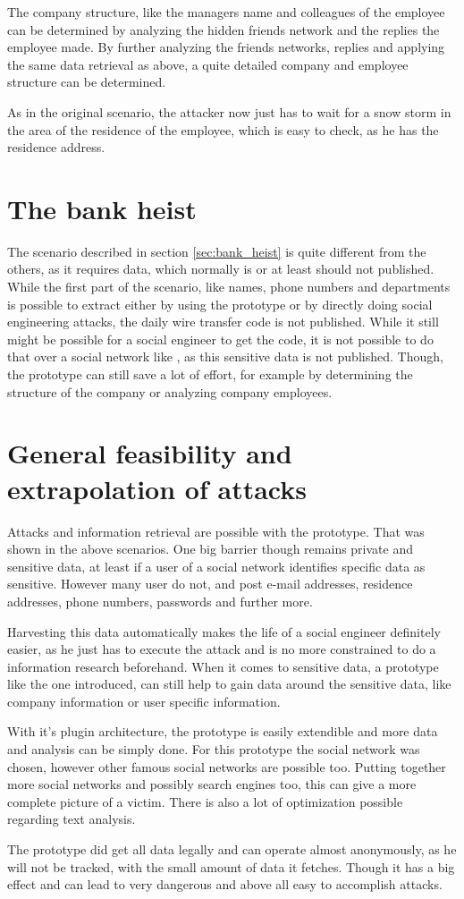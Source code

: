 The company structure, like the managers name and colleagues of the employee
can be determined by analyzing the hidden friends network and the replies the
employee made. By further analyzing the friends networks, replies and applying
the same data retrieval as above, a quite detailed company and employee
structure can be determined.

As in the original scenario, the attacker now just has to wait for a snow storm
in the area of the residence of the employee, which is easy to check, as he
has the residence address.

\section{The bank heist}

The scenario described in section \ref{sec:bank_heist} is quite different from
the others, as it requires data, which normally is or at least should not
published. While the first part of the scenario, like names, phone numbers and
departments is possible to extract either by using the prototype or by directly
doing social engineering attacks, the daily wire transfer code is not
published. While it still might be possible for a social engineer to get the
code, it is not possible to do that over a social network like \Twitter{}, as
this sensitive data is not published. Though, the prototype can still save a
lot of effort, for example by determining the structure of the company or
analyzing company employees.


\section{General feasibility and extrapolation of attacks}

Attacks and information retrieval are possible with the prototype. That was
shown in the above scenarios. One big barrier though remains private and
sensitive data, at least if a user of a social network identifies specific data
as sensitive. However many user do not, and post e-mail addresses, residence
addresses, phone numbers, passwords and further more.

Harvesting this data automatically makes the life of a social engineer
definitely easier, as he just has to execute the attack and is no more
constrained to do a information research beforehand. When it comes to sensitive
data, a prototype like the one introduced, can still help to gain data around
the sensitive data, like company information or user specific information.

With it's plugin architecture, the prototype is easily extendible and more data
and analysis can be simply done. For this prototype the \Twitter{} social
network was chosen, however other famous social networks are possible too.
Putting together more social networks and possibly search engines too, this can
give a more complete picture of a victim. There is also a lot of optimization
possible regarding text analysis.

The prototype did get all data legally and can operate almost anonymously, as
he will not be tracked, with the small amount of data it fetches. Though it has
a big effect and can lead to very dangerous and above all easy to accomplish
attacks.
